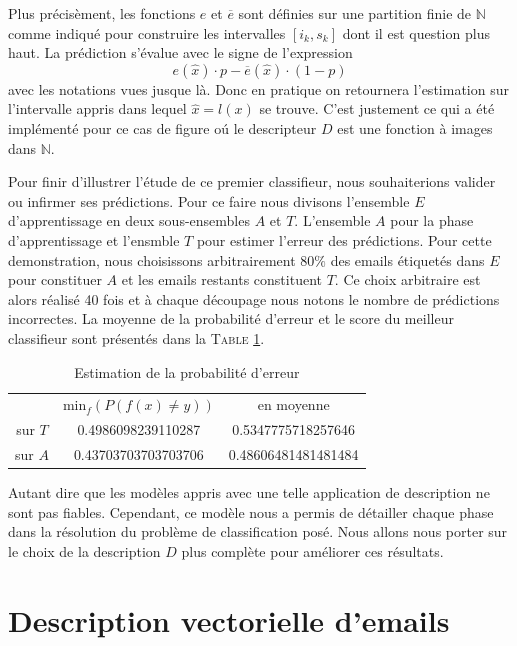 \documentclass[a4paper, french]{article}
\begin{document}
Plus pr\'ecis\`ement, les fonctions $e$ et $\overline{e}$ sont d\'efinies 
sur une partition finie de $\mathbb{N}$ comme indiqu\'e
pour construire les intervalles $[i_k,s_k]$ dont il est question plus haut.
La pr\'ediction s'\'evalue avec le signe de l'expression
\begin{equation}
    e(\hat{x}) \cdot p - \overline{e}(\hat{x}) \cdot (1-p)
\end{equation}
avec les notations vues jusque l\`a. Donc en pratique on retournera l'estimation 
sur l'intervalle appris dans lequel $\hat{x}=l(x)$ se trouve. C'est justement ce
qui a \'et\'e impl\'ement\'e pour ce cas de figure o\'u le descripteur $D$ est une
fonction \`a images dans $\mathbb{N}$.

Pour finir d'illustrer l'\'etude de ce premier classifieur, nous souhaiterions
valider ou infirmer ses pr\'edictions. Pour ce faire nous divisons
l'ensemble $E$ d'apprentissage en deux sous-ensembles $A$ et $T$. 
L'ensemble $A$ pour la phase d'apprentissage et l'ensmble $T$ pour 
estimer l'erreur des pr\'edictions. Pour cette demonstration, 
nous choisissons arbitrairement $80\%$ des emails \'etiquet\'es dans $E$ 
pour constituer $A$ et les emails restants constituent $T$. Ce choix arbitraire
est alors r\'ealis\'e 40 fois et \`a chaque d\'ecoupage nous notons le nombre
de pr\'edictions incorrectes. La moyenne de la probabilit\'e d'erreur et
le score du meilleur classifieur sont pr\'esent\'es dans la T\textsc{able}
\ref{tbl:erreur_exo2}.

\begin{table}[h]
\begin{center}
    \caption{Estimation de la probabilit\'e d'erreur}
    \vskip 4mm
    \begin{tabular}{ccc}
        &min$_f(P(f(x)\neq y))$&en moyenne\\
        sur $T$&0.4986098239110287&0.5347775718257646\\
        sur $A$&0.43703703703703706&0.48606481481481484
    \end{tabular}
    \label{tbl:erreur_exo2}
\end{center}
\end{table}

Autant dire que les mod\`eles appris avec une telle application de description
ne sont pas fiables. Cependant, ce mod\`ele nous a permis de d\'etailler chaque
phase dans la r\'esolution du probl\`eme de classification pos\'e. Nous allons
nous porter sur le choix de la description $D$ plus compl\`ete pour am\'eliorer
ces r\'esultats.

\section{Description vectorielle d'emails}

\end{document}
